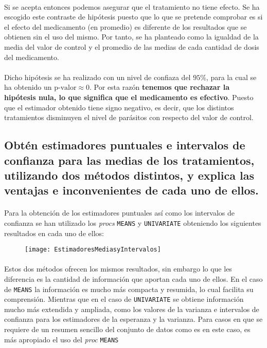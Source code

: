 \documentclass{article}
\begin{document}
      \paragraph{}
      Si se acepta entonces podemos asegurar que el tratamiento no tiene efecto. Se ha escogido este contraste de hipótesis puesto que lo que se pretende comprobar es si el efecto del medicamento (en promedio) es diferente de los resultados que se obtienen sin el uso del mismo. Por tanto, se ha planteado como la igualdad de la media del valor de control y el promedio de las medias de cada cantidad de dosis del medicamento.

      \paragraph{}
      Dicho hipótesis se ha realizado con un nivel de confiaza del $95\%$, para la cual se ha obtenido un $\text{p-valor}\approx 0$. Por esta razón \textbf{tenemos que rechazar la hipótesis nula, lo que significa que el medicamento es efectivo}. Puesto que el estimador obtenido tiene signo negativo, es decir, que los distintos tratamientos disminuyen el nivel de parásitos con respecto del valor de control.

    \subsection{Obtén estimadores puntuales e intervalos de confianza para las medias de los tratamientos, utilizando dos métodos distintos, y explica las ventajas e inconvenientes de cada uno de ellos.}

      \paragraph{}
      Para la obtención de los estimadores puntuales así como los intervalos de confianza se han utilizado los \emph{procs} \texttt{MEANS} y \texttt{UNIVARIATE} obteniendo los siguientes resultados en cada uno de ellos:


      \begin{figure}[H]
        \centering
        \texttt{[image: EstimadoresMediasyIntervalos]}
      \end{figure}

      \paragraph{}
      Estos dos métodos ofrecen los mismos resultados, sin embargo lo que les diferencia es la cantidad de información que aportan cada uno de ellos. En el caso de \texttt{MEANS} la información es mucho más compacta y resumida, lo cual facilita su comprensión. Mientras que en el caso de \texttt{UNIVARIATE} se obtiene información mucho más extendida y ampliada, como los valores de la varianza e intervalos de confianza para los estimadores de la esperanza y la varianza. Para casos en que se requiere de un resumen sencillo del conjunto de datos como es en este caso, es más apropiado el uso del \emph{proc} \texttt{MEANS}
\end{document}
